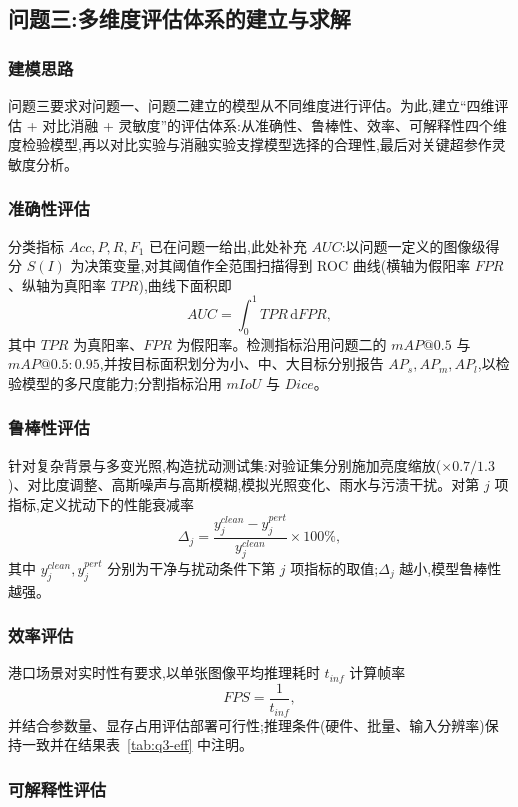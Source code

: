 \subsection{问题三:多维度评估体系的建立与求解}

\subsubsection{建模思路}

问题三要求对问题一、问题二建立的模型从不同维度进行评估。为此,建立“四维评估 + 对比消融 + 灵敏度”的评估体系:从准确性、鲁棒性、效率、可解释性四个维度检验模型,再以对比实验与消融实验支撑模型选择的合理性,最后对关键超参作灵敏度分析。

\subsubsection{准确性评估}

分类指标 $Acc,P,R,F_1$ 已在问题一给出,此处补充 $AUC$:以问题一定义的图像级得分 $S(I)$ 为决策变量,对其阈值作全范围扫描得到 ROC 曲线(横轴为假阳率 $FPR$、纵轴为真阳率 $TPR$),曲线下面积即
\[
AUC=\int_0^1 TPR\,\mathrm{d}FPR,
\]
其中 $TPR$ 为真阳率、$FPR$ 为假阳率。检测指标沿用问题二的 $mAP@0.5$ 与 $mAP@0.5:0.95$,并按目标面积划分为小、中、大目标分别报告 $AP_s,AP_m,AP_l$,以检验模型的多尺度能力;分割指标沿用 $mIoU$ 与 $Dice$。

\subsubsection{鲁棒性评估}

针对复杂背景与多变光照,构造扰动测试集:对验证集分别施加亮度缩放($\times0.7/1.3$)、对比度调整、高斯噪声与高斯模糊,模拟光照变化、雨水与污渍干扰。对第 $j$ 项指标,定义扰动下的性能衰减率
\[
\Delta_j=\frac{y_j^{clean}-y_j^{pert}}{y_j^{clean}}\times 100\%,
\]
其中 $y_j^{clean},y_j^{pert}$ 分别为干净与扰动条件下第 $j$ 项指标的取值;$\Delta_j$ 越小,模型鲁棒性越强。

\subsubsection{效率评估}

港口场景对实时性有要求,以单张图像平均推理耗时 $t_{inf}$ 计算帧率
\[
FPS=\frac{1}{t_{inf}},
\]
并结合参数量、显存占用评估部署可行性;推理条件(硬件、批量、输入分辨率)保持一致并在结果表~\ref{tab:q3-eff} 中注明。

\subsubsection{可解释性评估}

